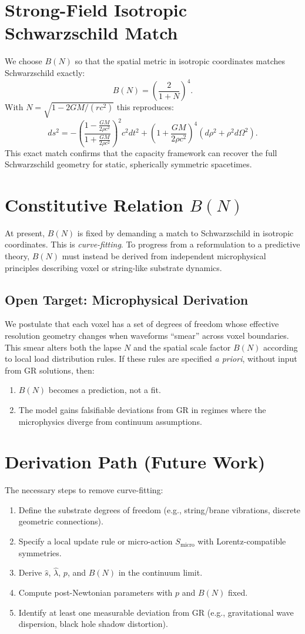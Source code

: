 \documentclass[12pt]{article}
\begin{document}
\section{Strong-Field Isotropic Schwarzschild Match}
We choose $B(N)$ so that the spatial metric in isotropic coordinates matches Schwarzschild exactly:
\[
B(N) = \left( \frac{2}{1+N} \right)^4.
\]
With $N = \sqrt{1-2GM/(rc^2)}$ this reproduces:
\[
ds^2 = -\left(\frac{1-\frac{GM}{2\rho c^2}}{1+\frac{GM}{2\rho c^2}}\right)^2 c^2 dt^2 + \left(1+\frac{GM}{2\rho c^2}\right)^4 (d\rho^2 + \rho^2 d\Omega^2).
\]
This exact match confirms that the capacity framework can recover the full Schwarzschild geometry for static, spherically symmetric spacetimes.

\section{Constitutive Relation $B(N)$}
At present, $B(N)$ is fixed by demanding a match to Schwarzschild in isotropic coordinates.  
This is \emph{curve-fitting}.  
To progress from a reformulation to a predictive theory, $B(N)$ must instead be derived from independent microphysical principles describing voxel or string-like substrate dynamics.

\subsection*{Open Target: Microphysical Derivation}
We postulate that each voxel has a set of degrees of freedom whose effective resolution geometry changes when waveforms ``smear'' across voxel boundaries.  
This smear alters both the lapse $N$ and the spatial scale factor $B(N)$ according to local load distribution rules.  
If these rules are specified \emph{a priori}, without input from GR solutions, then:
\begin{enumerate}
\item $B(N)$ becomes a prediction, not a fit.
\item The model gains falsifiable deviations from GR in regimes where the microphysics diverge from continuum assumptions.
\end{enumerate}

\section{Derivation Path (Future Work)}
The necessary steps to remove curve-fitting:
\begin{enumerate}
\item Define the substrate degrees of freedom (e.g., string/brane vibrations, discrete geometric connections).
\item Specify a local update rule or micro-action $S_{\text{micro}}$ with Lorentz-compatible symmetries.
\item Derive $\hat{s}$, $\hat{\lambda}$, $p$, and $B(N)$ in the continuum limit.
\item Compute post-Newtonian parameters with $p$ and $B(N)$ fixed.
\item Identify at least one measurable deviation from GR (e.g., gravitational wave dispersion, black hole shadow distortion).
\end{enumerate}
\end{document}
